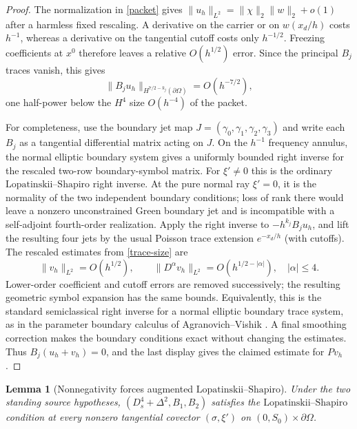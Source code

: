 \documentclass[11pt]{article}
\newtheorem{lemma}[theorem]{Lemma}
\newcommand{\Om}{\Omega}
\newcommand{\pa}{\partial}
\newcommand{\LS}{\text{Lopatinskii--Shapiro}}
\begin{document}
\begin{proof}
The normalization in \eqref{packet} gives $\|u_h\|_{L^2}=\|\chi\|_2
\|w\|_2+o(1)$ after a harmless fixed rescaling. A derivative on the carrier
or on $w(x_d/h)$ costs $h^{-1}$, whereas a derivative on the tangential
cutoff costs only $h^{-1/2}$. Freezing coefficients at $x^0$ therefore leaves
a relative $O(h^{1/2})$ error. Since the principal $B_j$ traces vanish, this
gives
\begin{equation}\label{trace-size}
 \|B_ju_h\|_{H^{7/2-k_j}(\pa\Om)}=O(h^{-7/2}),
\end{equation}
one half-power below the $H^4$ size $O(h^{-4})$ of the packet.

For completeness, use the boundary jet map
$J=(\gamma_0,\gamma_1,\gamma_2,\gamma_3)$ and write each $B_j$ as a
tangential differential matrix acting on $J$. On the $h^{-1}$ frequency
annulus, the normal elliptic boundary system gives a uniformly bounded right
inverse for the rescaled two-row boundary-symbol matrix. For $\xi'\ne0$ this
is the ordinary $\LS$ right inverse. At the pure normal ray $\xi'=0$, it is
the normality of the two independent boundary conditions; loss of rank there
would leave a nonzero unconstrained Green boundary jet and is incompatible
with a self-adjoint fourth-order realization. Apply the right inverse to
$-h^{k_j}B_ju_h$, and lift the resulting four jets by the usual Poisson trace
extension $e^{-x_d/h}$ (with cutoffs). The rescaled estimates from
\eqref{trace-size} are
\[
 \|v_h\|_{L^2}=O(h^{1/2}),\qquad
 \|D^\alpha v_h\|_{L^2}=O(h^{1/2-|\alpha|}),\quad |\alpha|\le4.
\]
Lower-order coefficient and cutoff errors are removed successively; the
resulting geometric symbol expansion has the same bounds. Equivalently, this
is the standard semiclassical right inverse for a normal elliptic boundary
trace system, as in the parameter boundary calculus of
Agranovich--Vishik \cite{AV}. A final smoothing correction makes the boundary
conditions exact without changing the estimates. Thus
$B_j(u_h+v_h)=0$, and the last display gives the claimed estimate for $Pv_h$.
\end{proof}

\begin{lemma}[Nonnegativity forces augmented $\LS$]\label{automatic}
Under the two standing source hypotheses, $(D_s^4+\Delta^2,B_1,B_2)$
satisfies the $\LS$ condition at every nonzero tangential covector
$(\sigma,\xi')$ on $(0,S_0)\times\pa\Om$.
\end{lemma}
\end{document}
